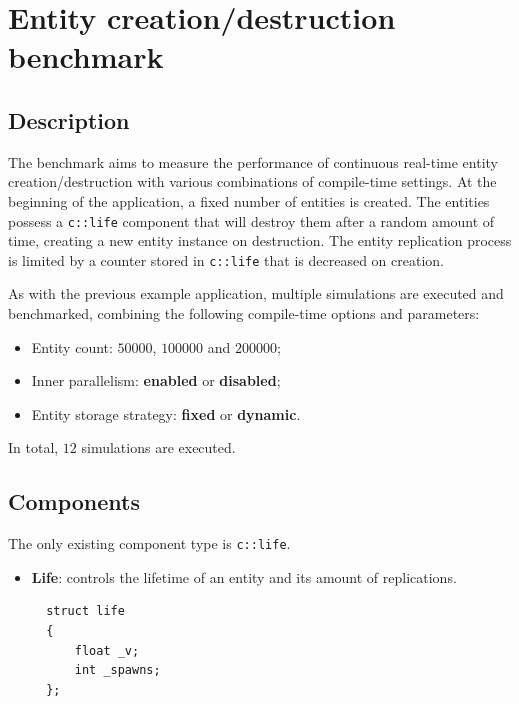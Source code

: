 \documentclass[oneside, 12pt, a4paper, openany]{book}
\begin{document}
\chapter{Entity creation/destruction
benchmark}\label{entity-creationdestruction-benchmark}

\section{Description}\label{description-1}

The benchmark aims to measure the performance of continuous real-time
entity creation/destruction with various combinations of compile-time
settings. At the beginning of the application, a fixed number of
entities is created. The entities possess a
\texttt{c::life}
component that will destroy them after a random amount of time, creating
a new entity instance on destruction. The entity replication process is
limited by a counter stored in
\texttt{c::life}
that is decreased on creation.

As with the previous example application, multiple simulations are
executed and benchmarked, combining the following compile-time options
and parameters:

\begin{itemize}
\item
  Entity count: \(50000\), \(100000\) and \(200000\);
\item
  Inner parallelism: \textbf{enabled} or \textbf{disabled};
\item
  Entity storage strategy: \textbf{fixed} or \textbf{dynamic}.
\end{itemize}

In total, \(12\) simulations are executed.

\section{Components}\label{components-1}

The only existing component type is
\texttt{c::life}.

\begin{itemize}
\item
  \textbf{Life}: controls the lifetime of an entity and its amount of
  replications.

  \begin{verbatim}
  struct life
  {
      float _v;
      int _spawns;
  };
  \end{verbatim}
\end{itemize}
\end{document}
